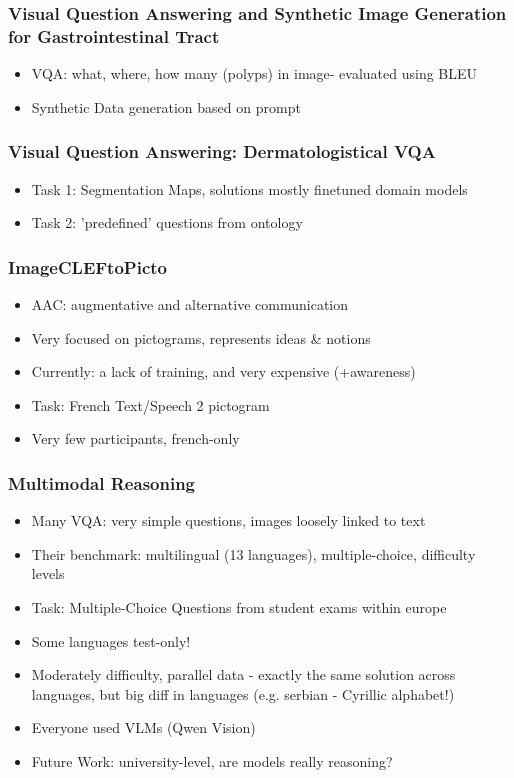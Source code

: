 \documentclass[a4paper]{article}
\begin{document}
\subsubsection{Visual Question Answering and Synthetic Image Generation for Gastrointestinal Tract}
\begin{itemize}
    \item VQA: what, where, how many (polyps) in image- evaluated using BLEU
    \item Synthetic Data generation based on prompt
\end{itemize}
\subsubsection{Visual Question Answering: Dermatologistical VQA}
\begin{itemize}
    \item Task 1: Segmentation Maps, solutions mostly finetuned domain models
    \item Task 2: 'predefined' questions from ontology
\end{itemize}
\subsubsection{ImageCLEFtoPicto}
\begin{itemize}
    \item AAC: augmentative and alternative communication
    \item Very focused on pictograms, represents ideas \& notions
    \item  Currently: a lack of training, and very expensive (+awareness)
    \item Task: French Text/Speech 2 pictogram
    \item Very few participants, french-only
\end{itemize}
\subsubsection{Multimodal Reasoning}
\begin{itemize}
    \item Many VQA: very simple questions, images loosely linked to text
    \item Their benchmark: multilingual (13 languages), multiple-choice, difficulty levels
    \item Task: Multiple-Choice Questions from student exams within europe
    \item Some languages test-only!
    \item Moderately difficulty, parallel data - exactly the same solution across languages, but big diff in languages (e.g. serbian - Cyrillic alphabet!)
    \item Everyone used VLMs (Qwen Vision)
    \item Future Work: university-level, are models really reasoning?
\end{itemize}
\end{document}
